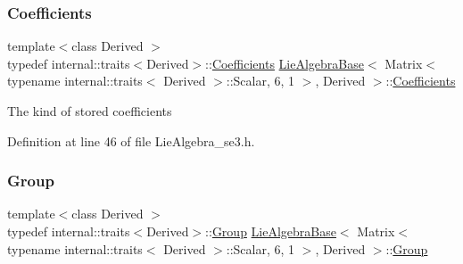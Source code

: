 \subsubsection{\texorpdfstring{Coefficients}{Coefficients}}
{\footnotesize\ttfamily template$<$class Derived $>$ \\
typedef internal\+::traits$<$Derived$>$\+::\hyperlink{class_lie_algebra_base_3_01_matrix_3_01typename_01internal_1_1traits_3_01_derived_01_4_1_1_scala449314c781550590437697c4dc21a6d4_a52a52c9b33e2ec0441866069e20473ab}{Coefficients} \hyperlink{class_lie_algebra_base}{Lie\+Algebra\+Base}$<$ Matrix$<$ typename internal\+::traits$<$ Derived $>$\+::Scalar, 6, 1 $>$, Derived $>$\+::\hyperlink{class_lie_algebra_base_3_01_matrix_3_01typename_01internal_1_1traits_3_01_derived_01_4_1_1_scala449314c781550590437697c4dc21a6d4_a52a52c9b33e2ec0441866069e20473ab}{Coefficients}}

The kind of stored coefficients 

Definition at line 46 of file Lie\+Algebra\+\_\+se3.\+h.

\hypertarget{class_lie_algebra_base_3_01_matrix_3_01typename_01internal_1_1traits_3_01_derived_01_4_1_1_scala449314c781550590437697c4dc21a6d4_a578d3791e63ec84b43491f4487f0dffa}{}\label{class_lie_algebra_base_3_01_matrix_3_01typename_01internal_1_1traits_3_01_derived_01_4_1_1_scala449314c781550590437697c4dc21a6d4_a578d3791e63ec84b43491f4487f0dffa} 
\subsubsection{\texorpdfstring{Group}{Group}}
{\footnotesize\ttfamily template$<$class Derived $>$ \\
typedef internal\+::traits$<$Derived$>$\+::\hyperlink{class_lie_algebra_base_3_01_matrix_3_01typename_01internal_1_1traits_3_01_derived_01_4_1_1_scala449314c781550590437697c4dc21a6d4_a578d3791e63ec84b43491f4487f0dffa}{Group} \hyperlink{class_lie_algebra_base}{Lie\+Algebra\+Base}$<$ Matrix$<$ typename internal\+::traits$<$ Derived $>$\+::Scalar, 6, 1 $>$, Derived $>$\+::\hyperlink{class_lie_algebra_base_3_01_matrix_3_01typename_01internal_1_1traits_3_01_derived_01_4_1_1_scala449314c781550590437697c4dc21a6d4_a578d3791e63ec84b43491f4487f0dffa}{Group}}

